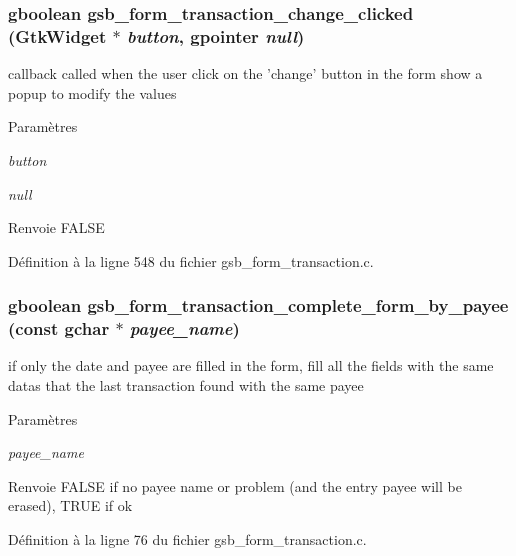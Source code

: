 \subsubsection[{gsb\_\-form\_\-transaction\_\-change\_\-clicked}]{\setlength{\rightskip}{0pt plus 5cm}gboolean gsb\_\-form\_\-transaction\_\-change\_\-clicked (GtkWidget $\ast$ {\em button}, \/  gpointer {\em null})}\label{gsb__form__transaction_8c_a927a6c6a4223e910e227c7683bd5d841}
callback called when the user click on the 'change' button in the form show a popup to modify the values


\begin{DoxyParams}{Paramètres}
\item[{\em button}]\item[{\em null}]\end{DoxyParams}
\begin{DoxyReturn}{Renvoie}
FALSE 
\end{DoxyReturn}


Définition à la ligne 548 du fichier gsb\_\-form\_\-transaction.c.

\subsubsection[{gsb\_\-form\_\-transaction\_\-complete\_\-form\_\-by\_\-payee}]{\setlength{\rightskip}{0pt plus 5cm}gboolean gsb\_\-form\_\-transaction\_\-complete\_\-form\_\-by\_\-payee (const gchar $\ast$ {\em payee\_\-name})}\label{gsb__form__transaction_8c_a97f907f396b67e7383c6e3ff747e4277}
if only the date and payee are filled in the form, fill all the fields with the same datas that the last transaction found with the same payee


\begin{DoxyParams}{Paramètres}
\item[{\em payee\_\-name}]\end{DoxyParams}
\begin{DoxyReturn}{Renvoie}
FALSE if no payee name or problem (and the entry payee will be erased), TRUE if ok 
\end{DoxyReturn}


Définition à la ligne 76 du fichier gsb\_\-form\_\-transaction.c.

